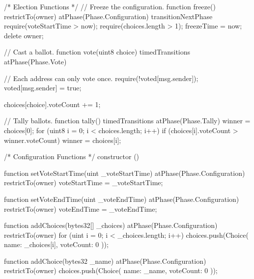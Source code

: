 \begin{solidity}
{  /* Election Functions */
  // Freeze the configuration.
  function freeze() restrictTo(owner) atPhase(Phase.Configuration) transitionNextPhase {
    require(voteStartTime > now);
    require(choices.length > 1);
    freezeTime = now;
    delete owner;
  }

  // Cast a ballot.
  function vote(uint8 choice) timedTransitions atPhase(Phase.Vote) {
    // Each address can only vote once.
    require(!voted[msg.sender]);
    voted[msg.sender] = true;

    choices[choice].voteCount += 1;
  }

  // Tally ballots.
  function tally() timedTransitions atPhase(Phase.Tally) {
    winner = choices[0];
    for (uint8 i = 0; i < choices.length; i++) {
      if (choices[i].voteCount > winner.voteCount)
        winner = choices[i];
    }
  }

  /* Configuration Functions */
  constructor () {}

  function setVoteStartTime(uint _voteStartTime) atPhase(Phase.Configuration) restrictTo(owner) {
    voteStartTime = _voteStartTime;
  }

  function setVoteEndTime(uint _voteEndTime) atPhase(Phase.Configuration) restrictTo(owner) {
    voteEndTime = _voteEndTime;
  }

  function addChoices(bytes32[] _choices) atPhase(Phase.Configuration) restrictTo(owner) {
    for (uint i = 0; i < _choices.length; i++) {
      choices.push(Choice({
        name: _choices[i],
        voteCount: 0
      }));
    }
  }

  function addChoice(bytes32 _name) atPhase(Phase.Configuration) restrictTo(owner) {
    choices.push(Choice({
      name: _name,
      voteCount: 0
    }));
  }
}
\end{solidity}

